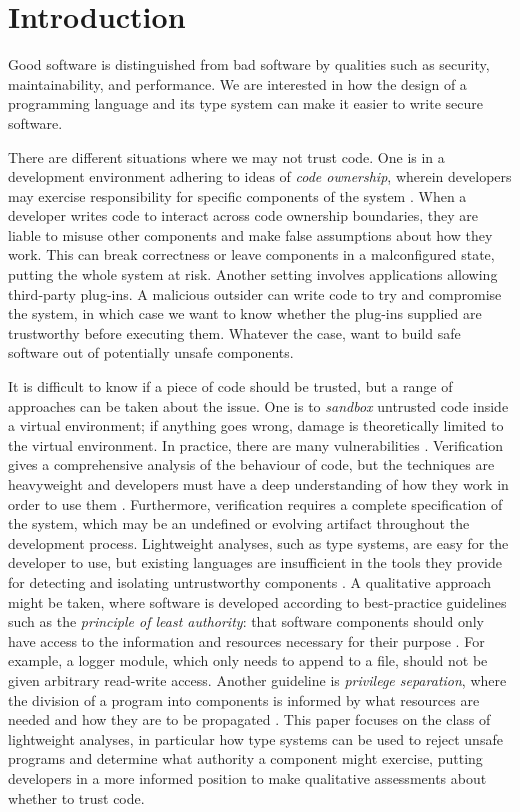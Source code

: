 
\section{Introduction}


Good software is distinguished from bad software by qualities such as security, maintainability, and performance. We are interested in how the design of a programming language and its type system can make it easier to write secure software.

There are different situations where we may not trust code. One is in a development environment adhering to ideas of \textit{code ownership}, wherein developers may exercise responsibility for specific components of the system \cite{bird11}. When a developer writes code to interact across code ownership boundaries, they are liable to misuse other components and make false assumptions about how they work. This can break correctness or leave components in a malconfigured state, putting the whole system at risk. Another setting involves applications allowing third-party plug-ins. A malicious outsider can write code to try and compromise the system, in which case we want to know whether the plug-ins supplied are trustworthy before executing them. Whatever the case, want to build safe software out of potentially unsafe components.

It is difficult to know if a piece of code should be trusted, but a range of approaches can be taken about the issue. One is to \textit{sandbox} untrusted code inside a virtual environment; if anything goes wrong, damage is theoretically limited to the virtual environment. In practice, there are many  vulnerabilities \cite{coker15, maass16, watson07, schreuders13}. Verification gives a comprehensive analysis of the behaviour of code, but the techniques are heavyweight and developers must have a deep understanding of how they work in order to use them \cite{kneuper97}. Furthermore, verification requires a complete specification of the system, which may be an undefined or evolving artifact throughout the development process. Lightweight analyses, such as type systems, are easy for the developer to use, but existing languages are insufficient in the tools they provide for detecting and isolating untrustworthy components \cite{chen07, ter-louw08}. A qualitative approach might be taken, where software is developed according to best-practice guidelines such as the \textit{principle of least authority}: that software components should only have access to the information and resources necessary for their purpose \cite{saltzer74}. For example, a logger module, which only needs to append to a file, should not be given arbitrary read-write access. Another guideline is \textit{privilege separation}, where the division of a program into components is informed by what resources are needed and how they are to be propagated \cite{saltzer75}. This paper focuses on the class of lightweight analyses, in particular how type systems can be used to reject unsafe programs and determine what authority a component might exercise, putting developers in a more informed position to make qualitative assessments about whether to trust code.

